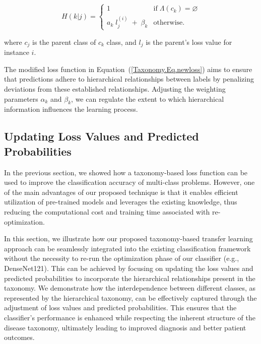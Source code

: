 \documentclass[preprint,3p,times, review]{elsarticle}
\begin{document}
\begin{equation}
    \label{Taxonomy.Eq.8.hierarchical_penalty.loss}
    H(k\vert j)=\left\{\begin{array}{lc}1&\text{if} \; \Lambda(c_k)=\varnothing\\a_k\;l_j^{(i)}\;+\;\beta_k&\text{otherwise.}\end{array}\right.
\end{equation}

where $c_j $ is the parent class of $c_k $ class, and $l_j $ is the parent's loss value for instance $i $.

The modified loss function in Equation~(\ref{Taxonomy.Eq.newloss})  aims to ensure that predictions adhere to hierarchical relationships between labels by penalizing deviations from these established relationships. Adjusting the weighting parameters $\alpha_k $ and $\beta_k $, we can regulate the extent to which hierarchical information influences the learning process.



\subsection{Updating Loss Values and Predicted Probabilities}

In the previous section, we showed how a taxonomy-based loss function can be used to improve the classification accuracy of multi-class problems. However, one of the main advantages of our proposed technique is that it enables efficient utilization of pre-trained models and leverages the existing knowledge, thus reducing the computational cost and training time associated with re-optimization.

In this section, we illustrate how our proposed taxonomy-based transfer learning approach can be seamlessly integrated into the existing classification framework without the necessity to re-run the optimization phase of our classifier (e.g., DenseNet121). This can be achieved by focusing on updating the loss values and predicted probabilities to incorporate the hierarchical relationships present in the taxonomy. We demonstrate how the interdependence between different classes, as represented by the hierarchical taxonomy, can be effectively captured through the adjustment of loss values and predicted probabilities. This ensures that the classifier's performance is enhanced while respecting the inherent structure of the disease taxonomy, ultimately leading to improved diagnosis and better patient outcomes.
\end{document}

